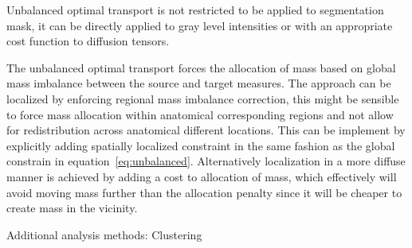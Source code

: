 \documentclass{llncs}
\begin{document}
Unbalanced optimal transport is not restricted to be applied to segmentation
mask, it can be directly applied to gray level intensities or with an
appropriate cost function to diffusion tensors. 

The unbalanced optimal transport forces the allocation of mass based on global
mass imbalance between the source and target measures. The approach can be
localized by enforcing regional mass imbalance correction, this might be
sensible to force mass allocation within anatomical corresponding regions and
not allow for redistribution across anatomical different locations. This can be
implement by explicitly adding spatially localized constraint in the same
fashion as the global constrain in equation~\ref{eq:unbalanced}. Alternatively
localization in a more diffuse manner is achieved by adding a cost to
allocation of mass, which effectively will avoid moving mass further than the
allocation penalty since it will be cheaper to create mass in the vicinity.

Additional analysis methods: Clustering

\footnotesize


\end{document}
